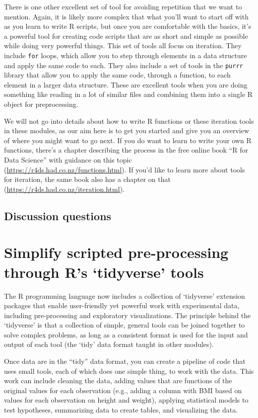\documentclass[]{tufte-book}
\begin{document}
There is one other excellent set of tool for avoiding repetition that we want to
mention. Again, it is likely more complex that what you'll want to start off
with as you learn to write R scripts, but once you are comfortable with the
basics, it's a powerful tool for creating code scripts that are as short and
simple as possible while doing very powerful things. This set of tools all focus
on iteration. They include \texttt{for} loops, which allow you to step through elements
in a data structure and apply the same code to each. They also include a set of
tools in the \texttt{purrr} library that allow you to apply the same code, through a
function, to each element in a larger data structure. These are excellent tools
when you are doing something like reading in a lot of similar files and
combining them into a single R object for preprocessing.

We will not go into details about how to write R functions or these iteration
tools in these modules, as our aim here is to get you started and give you an
overview of where you might want to go next. If you do want to learn to write
your own R functions, there's a chapter describing the process in the free
online book ``R for Data Science'' with guidance on this topic
(\url{https://r4ds.had.co.nz/functions.html}). If you'd like to learn more about tools
for iteration, the same book also has a chapter on that
(\url{https://r4ds.had.co.nz/iteration.html}).

\subsection{Discussion questions}\label{discussion-questions-3}

\section{Simplify scripted pre-processing through R's `tidyverse' tools}\label{module14}

The R programming language now includes a collection of `tidyverse' extension
packages that enable user-friendly yet powerful work with experimental data,
including pre-processing and exploratory visualizations. The principle behind
the `tidyverse' is that a collection of simple, general tools can be joined
together to solve complex problems, as long as a consistent format is used for
the input and output of each tool (the `tidy' data format taught in other
modules).

Once data are in the ``tidy'' data format, you can create a pipeline of code that
uses small tools, each of which does one simple thing, to work with the data.
This work can include cleaning the data, adding values that are functions of the
original values for each observation (e.g., adding a column with BMI based on
values for each observation on height and weight), applying statistical models to
test hypotheses, summarizing data to create tables, and visualizing the data.
\end{document}
